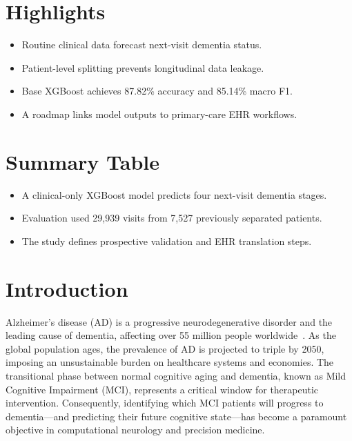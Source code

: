 \documentclass[preprint,12pt]{elsarticle}
\begin{document}
\begin{samepage}
\section*{Highlights}
\begin{itemize}
    \item Routine clinical data forecast next-visit dementia status.
    \item Patient-level splitting prevents longitudinal data leakage.
    \item Base XGBoost achieves 87.82\% accuracy and 85.14\% macro F1.
    \item A roadmap links model outputs to primary-care EHR workflows.
\end{itemize}

\section*{Summary Table}
\begin{itemize}
    \item A clinical-only XGBoost model predicts four next-visit dementia stages.
    \item Evaluation used 29,939 visits from 7,527 previously separated patients.
    \item The study defines prospective validation and EHR translation steps.
\end{itemize}
\end{samepage}

\linenumbers

\section{Introduction}

Alzheimer's disease (AD) is a progressive neurodegenerative disorder and the leading cause of dementia, affecting over 55 million people worldwide~\cite{alz2024,gbd2019}. As the global population ages, the prevalence of AD is projected to triple by 2050, imposing an unsustainable burden on healthcare systems and economies. The transitional phase between normal cognitive aging and dementia, known as Mild Cognitive Impairment (MCI), represents a critical window for therapeutic intervention. Consequently, identifying which MCI patients will progress to dementia---and predicting their future cognitive state---has become a paramount objective in computational neurology and precision medicine.
\end{document}
